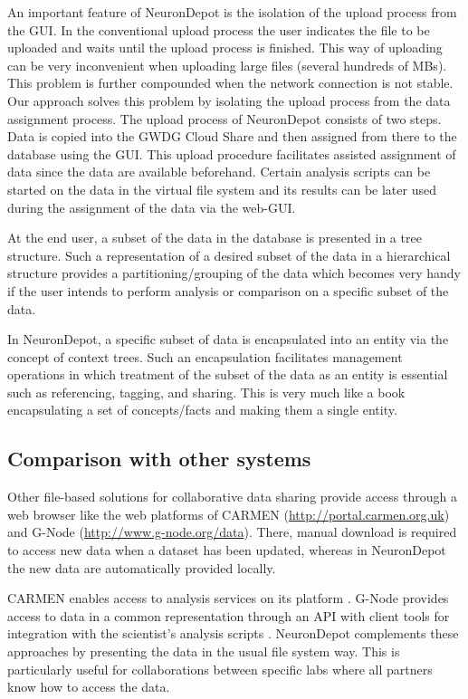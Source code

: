 \documentclass{frontiersSCNS} %
\begin{document}
An important feature of NeuronDepot is the isolation of the upload process from
the GUI. In the conventional upload process the user indicates the file to be
uploaded and waits until the upload process is finished. This way of uploading
can be very inconvenient when uploading large files (several hundreds of MBs).
This problem is further compounded when the network connection is not stable.
Our approach solves this problem by isolating the upload process from the data
assignment process. The upload process of NeuronDepot consists of two steps.
Data is copied into the GWDG Cloud Share and then assigned from there to the
database using the GUI. This upload procedure facilitates assisted assignment
of data since the data are available beforehand. Certain analysis scripts can
be started on the data in the virtual file system and its results can be later
used during the assignment of the data via the web-GUI.

At the end user, a subset of the data in the database is presented in a tree
structure. Such a representation of a desired subset of the data in a hierarchical
structure provides a partitioning/grouping of the data which becomes very handy
if the user intends to perform analysis or comparison on a specific subset of
the data.

In NeuronDepot, a specific subset of data is encapsulated into an entity via
the concept of context trees. Such an encapsulation facilitates management
operations in which treatment of the subset of the data as an entity is
essential such as referencing, tagging, and sharing. This is very much like a
book encapsulating a set of concepts/facts and making them a single entity.

\subsection{Comparison with other systems}

Other file-based solutions for collaborative data sharing provide access
through a web browser like the web platforms of CARMEN
(\url{http://portal.carmen.org.uk}) and G-Node
(\url{http://www.g-node.org/data}). There, manual download is required to
access new data when a dataset has been updated, whereas in NeuronDepot the new
data are automatically provided locally.

CARMEN enables access to analysis services on its platform
\citep{austin_carmen:_2011}. G-Node provides access to data in a common
representation through an API \citep{Sobolev_integrated_2014} with client tools for
integration with the scientist's analysis scripts \citep{Sobolev_data_2014}.
NeuronDepot complements these approaches by presenting the data in the usual
file system way. This is particularly useful for collaborations between
specific labs where all partners know how to access the data.
\end{document}
